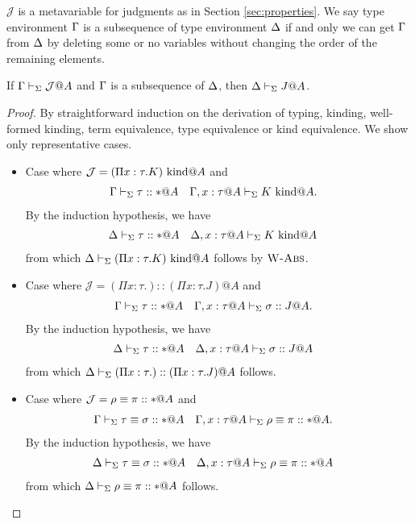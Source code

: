 $\mathcal{J}$ is a metavariable for judgments as in Section \ref{sec:properties}.
We say type environment \(\Gamma\) is a subsequence of type environment \(\Delta\)
if and only we can get \(\Gamma\) from \(\Delta\) by deleting some or no variables without changing the order of the remaining elements.
\begin{lemma}[Weakening]
	If \(\Gamma \vdash_\Sigma \mathcal{J}@A\) and \(\Gamma\) is a subsequence of \(\Delta\), then \(\Delta \vdash_\Sigma J@A\). 
\end{lemma}

\begin{proof}
	By straightforward induction on the derivation of typing, kinding, well-formed kinding,
	term equivalence, type equivalence or kind equivalence.
	We show only representative cases.
	\begin{itemize}
		\item[] Case \WAbs{} where $\mathcal{J} = (\Pi x:\tau.K)\text{\ kind} @A$ and 
		\begin{align*} 
			& \G \V \tau :: * @ A && \G,x:\tau@A \V K \iskind @A.
		\end{align*}
		By the induction hypothesis, we have
		\begin{align*}
			& \D \V \tau::*@A && \D, x:\tau@A \V K \iskind @ A
		\end{align*}
		from which $\Delta\vdash_\Sigma (\Pi x:\tau.K) \text{\ kind} @ A$ follows by $\textsc{W-Abs}$.

		\item[] Case \KAbs{} where $\mathcal{J} = (\Pi x:\tau.) :: (\Pi x:\tau.J)@A$ and 
		\begin{align*} 
			& \G \V \tau::*@A && \G,x:\tau@A\V \sigma :: J @ A.
		\end{align*}
		By the induction hypothesis, we have
		\begin{align*} 
			& \D \V \tau::*@A && \D,x:\tau@A\V \sigma :: J @ A
		\end{align*}
		from which $\Delta \vdash_\Sigma (\Pi x:\tau.) :: (\Pi x:\tau.J)@A$ follows.

		\item[] Case \QTAbs{} where \( \mathcal{J} = \rho \equiv \pi :: * @ A \) and
		\begin{align*} 
			& \G\V \tau \E \sigma :: *@A && \G,x:\tau@A \V \rho \E \pi :: *@A.
		\end{align*}
		By the induction hypothesis, we have
		\begin{align*} 
			& \D\V \tau \E \sigma :: *@A && \D,x:\tau@A \V \rho \E \pi :: *@A
		\end{align*}
		from which \( \Delta\vdash_\Sigma \rho \equiv \pi :: * @ A \) follows.

	\end{itemize}
\end{proof}

